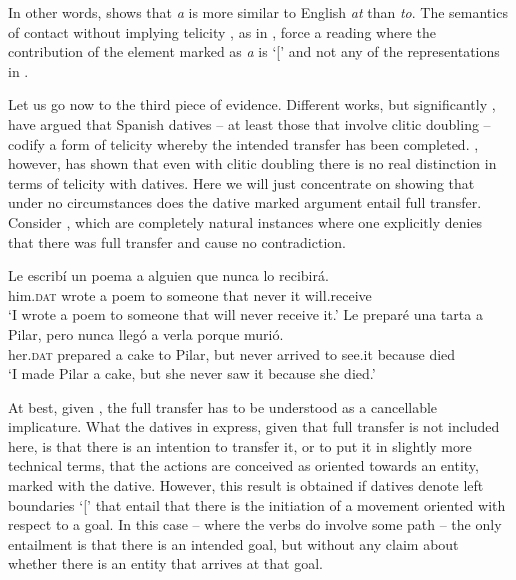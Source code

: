 \documentclass[output=paper,colorlinks,citecolor=brown,nonflat]{langsci/langscibook}
\begin{document}
In other words,  shows that \textit{a} is more similar to English \textit{at} than \textit{to}. The semantics of contact without implying telicity \citep{MarínMcNally2011}, as in , force a reading where the contribution of the element marked as \textit{a} is `[' and not any of the representations in .

Let us go now to the third piece of evidence. Different works, but significantly \citet{RomeroMorales1997}, have argued that Spanish datives – at least those that involve clitic doubling – codify a form of telicity whereby the intended transfer has been completed. \citet{Pineda2016}, however, has shown that even with clitic doubling there is no real distinction in terms of telicity with datives. Here we will just concentrate on showing that under no circumstances does the dative marked argument entail full transfer. Consider , which are completely natural instances where one explicitly denies that there was full transfer and cause no contradiction.

\ea%
    \label{ex:fabregas:23}
    \ea\label{ex:fabregas:23a}
    \gll    Le escribí un poema a alguien que nunca lo recibirá.\\
            {him.}\textsc{dat} {wrote} {a} {poem} {to} {someone} {that} {never} {it} {will.receive}\\
    \glt `I wrote a poem to someone that will never receive it.'
    \ex\label{ex:fabregas:23b}
    \gll    Le preparé una tarta a Pilar, pero nunca llegó a verla porque murió.\\
            {her.}\textsc{dat}   {prepared} {a} {cake} {to} {Pilar,} {but}  {never}  {arrived} {to} {see.it} {because} {died}\\
    \glt `I made Pilar a cake, but she never saw it because she died.'
    \z
\z

At best, given , the full transfer has to be understood as a cancellable implicature. What the datives in  express, given that full transfer is not included here, is that there is an intention to transfer it, or to put it in slightly more technical terms, that the actions are conceived as oriented towards an entity, marked with the dative. However, this result is obtained if datives denote left boundaries `[' that entail that there is the initiation of a movement oriented with respect to a goal. In this case – where the verbs do involve some path – the only entailment is that there is an intended goal, but without any claim about whether there is an entity that arrives at that goal.
\end{document}
